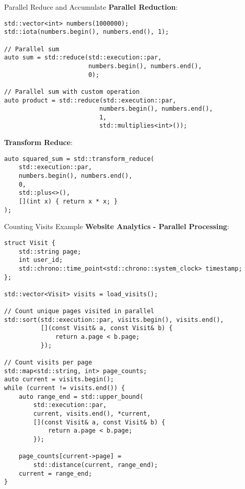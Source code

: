 \begin{frame}[fragile]{Parallel Reduce and Accumulate}
	\textbf{Parallel Reduction}:
	\begin{verbatim}
std::vector<int> numbers(1000000);
std::iota(numbers.begin(), numbers.end(), 1);

// Parallel sum
auto sum = std::reduce(std::execution::par,
                       numbers.begin(), numbers.end(),
                       0);

// Parallel sum with custom operation
auto product = std::reduce(std::execution::par,
                          numbers.begin(), numbers.end(),
                          1,
                          std::multiplies<int>());
	\end{verbatim}

	\textbf{Transform Reduce}:
	\begin{verbatim}
auto squared_sum = std::transform_reduce(
    std::execution::par,
    numbers.begin(), numbers.end(),
    0,
    std::plus<>(),
    [](int x) { return x * x; }
);
	\end{verbatim}
\end{frame}

\begin{frame}[fragile]{Counting Visits Example}
	\textbf{Website Analytics - Parallel Processing}:

	\begin{verbatim}
struct Visit {
    std::string page;
    int user_id;
    std::chrono::time_point<std::chrono::system_clock> timestamp;
};

std::vector<Visit> visits = load_visits();

// Count unique pages visited in parallel
std::sort(std::execution::par, visits.begin(), visits.end(),
          [](const Visit& a, const Visit& b) {
              return a.page < b.page;
          });

// Count visits per page
std::map<std::string, int> page_counts;
auto current = visits.begin();
while (current != visits.end()) {
    auto range_end = std::upper_bound(
        std::execution::par,
        current, visits.end(), *current,
        [](const Visit& a, const Visit& b) {
            return a.page < b.page;
        });

    page_counts[current->page] =
        std::distance(current, range_end);
    current = range_end;
}
	\end{verbatim}
\end{frame}

